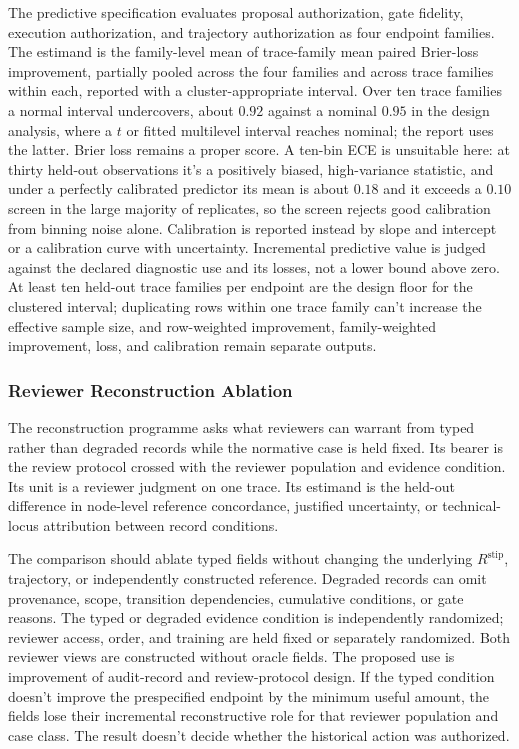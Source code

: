 The predictive specification evaluates proposal authorization, gate fidelity, execution authorization, and trajectory authorization as four endpoint families. The estimand is the family-level mean of trace-family mean paired Brier-loss improvement, partially pooled across the four families and across trace families within each, reported with a cluster-appropriate interval. Over ten trace families a normal interval undercovers, about \(0.92\) against a nominal \(0.95\) in the design analysis, where a \(t\) or fitted multilevel interval reaches nominal; the report uses the latter. Brier loss remains a proper score. A ten-bin ECE is unsuitable here: at thirty held-out observations it's a positively biased, high-variance statistic, and under a perfectly calibrated predictor its mean is about \(0.18\) and it exceeds a \(0.10\) screen in the large majority of replicates, so the screen rejects good calibration from binning noise alone. Calibration is reported instead by slope and intercept or a calibration curve with uncertainty. Incremental predictive value is judged against the declared diagnostic use and its losses, not a lower bound above zero. At least ten held-out trace families per endpoint are the design floor for the clustered interval; duplicating rows within one trace family can't increase the effective sample size, and row-weighted improvement, family-weighted improvement, loss, and calibration remain separate outputs.

\subsubsection{Reviewer Reconstruction Ablation}

The reconstruction programme asks what reviewers can warrant from typed rather than degraded records while the normative case is held fixed. Its bearer is the review protocol crossed with the reviewer population and evidence condition. Its unit is a reviewer judgment on one trace. Its estimand is the held-out difference in node-level reference concordance, justified uncertainty, or technical-locus attribution between record conditions.

The comparison should ablate typed fields without changing the underlying \(R^{\mathrm{stip}}\), trajectory, or independently constructed reference. Degraded records can omit provenance, scope, transition dependencies, cumulative conditions, or gate reasons. The typed or degraded evidence condition is independently randomized; reviewer access, order, and training are held fixed or separately randomized. Both reviewer views are constructed without oracle fields. The proposed use is improvement of audit-record and review-protocol design. If the typed condition doesn't improve the prespecified endpoint by the minimum useful amount, the fields lose their incremental reconstructive role for that reviewer population and case class. The result doesn't decide whether the historical action was authorized.

